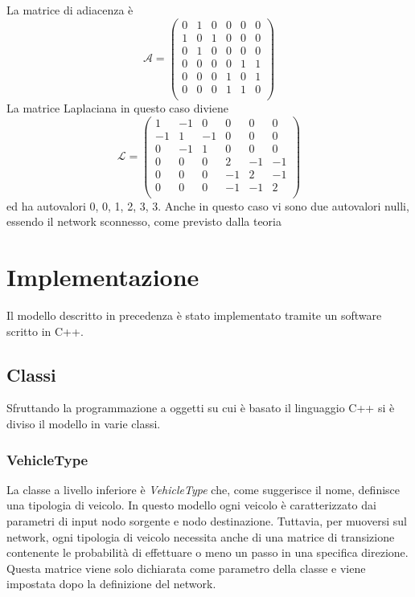 \documentclass[../main.tex]{subfiles}
\begin{document}
La matrice di adiacenza \`e
\begin{equation}
    \mathcal{A}=\left(
    \begin{matrix}
        0 & 1 & 0 & 0 & 0 & 0\\
        1 & 0 & 1 & 0 & 0 & 0\\
        0 & 1 & 0 & 0 & 0 & 0\\
        0 & 0 & 0 & 0 & 1 & 1\\
        0 & 0 & 0 & 1 & 0 & 1\\
        0 & 0 & 0 & 1 & 1 & 0\\
    \end{matrix}\right)
\end{equation}
La matrice Laplaciana in questo caso diviene
\begin{equation}
    \mathcal{L}=\left(
    \begin{matrix}
        1 & -1 & 0 & 0 & 0 & 0\\
        -1 & 1 & -1 & 0 & 0 & 0\\
        0 & -1 & 1 & 0 & 0 & 0\\
        0 & 0 & 0 & 2 & -1 & -1\\
        0 & 0 & 0 & -1 & 2 & -1\\
        0 & 0 & 0 & -1 & -1 & 2\\
    \end{matrix}\right)
\end{equation}
ed ha autovalori 0, 0, 1, 2, 3, 3.
Anche in questo caso vi sono due autovalori nulli, essendo il network sconnesso, come previsto dalla teoria

\chapter{Implementazione}
Il modello descritto in precedenza \`e stato implementato tramite un software scritto in C++.
\section{Classi}
Sfruttando la programmazione a oggetti su cui \`e basato il linguaggio C++ si \`e diviso il modello in varie classi.
\subsection{VehicleType}
La classe a livello inferiore \`e \emph{VehicleType} che, come suggerisce il nome, definisce una tipologia di veicolo.
In questo modello ogni veicolo \`e caratterizzato dai parametri di input nodo sorgente e nodo destinazione.
Tuttavia, per muoversi sul network, ogni tipologia di veicolo necessita anche di una matrice di transizione contenente le probabilità di effettuare o meno un passo in una specifica direzione.
Questa matrice viene solo dichiarata come parametro della classe e viene impostata dopo la definizione del network.
\end{document}
